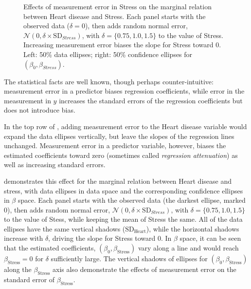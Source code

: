 \begin{figure}[htb]
\begin{minipage}[b]{.49\linewidth}
 \end{minipage}
  \caption{Effects of measurement error in Stress on the marginal relation between Heart disease and Stress.
  Each panel starts with the observed data ($\delta=0$), then adds random normal error,
  $\mathcal{N}(0, \delta \times \mathrm{SD}_{Stress})$, with $\delta = \{0.75, 1.0, 1.5\}$ to the value of Stress.
  Increasing measurement error biases the slope for Stress toward 0.
  Left: 50\% data ellipses; right: 50\% confidence ellipses for $(\beta_0, \beta_{Stress})$. }
  \label{fig:coffee-stress}
\end{figure}

The statistical facts are well known, though perhaps counter-intuitive:
measurement error in a predictor biases regression coefficients, while
error in the measurement in  $y$
increases the standard errors of the regression coefficients but does not introduce
bias.


In the top row of
, adding measurement error to the Heart disease variable
would expand the data ellipses vertically, but leave the slopes of the regression lines unchanged.
Measurement error in a predictor variable, however, biases the estimated coefficients toward
zero (sometimes called \emph{regression attenuation}) as well as increasing standard errors.
                                         
 demonstrates this effect for the marginal
relation between Heart disease and stress,
with data ellipses in data space and the corresponding confidence ellipses in $\beta$ space.
Each panel starts with the observed data (the darkest ellipse, marked $0$), then adds random normal error,
$\mathcal{N}(0, \delta \times \mathrm{SD}_{Stress})$, with $\delta = \{0.75, 1.0, 1.5\}$ to the value of Stess,
while keeping the mean of Stress the same.
All of the data ellipses have the same vertical shadows ($\mathrm{SD}_{\textrm{Heart}}$), while the horizontal shadows
increase with $\delta$, driving the slope for Stress toward 0.
In $\beta$ space, it can be seen that the estimated coefficients, $(\beta_0, \beta_{\textrm{Stress}})$
vary along a line and would reach $\beta_{\textrm{Stress}}=0$ for $\delta$ sufficiently large.
The vertical shadows of
ellipses for $(\beta_0, \beta_{\textrm{Stress}})$ along the $\beta_{\textrm{Stress}}$ axis
also demonstrate the effects of measurement error
on the standard error of $\beta_{\textrm{Stress}}$.


